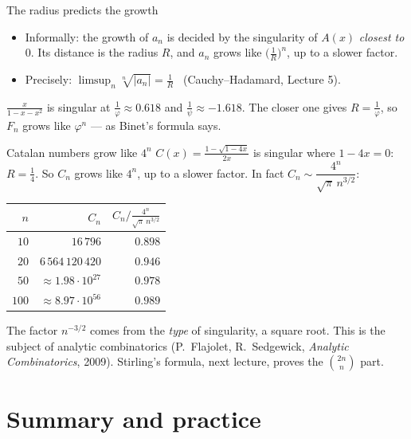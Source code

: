 \documentclass{wosm-slides}
\begin{document}
\begin{frame}{The radius predicts the growth}
  \begin{itemize}
    \item Informally: the growth of $a_n$ is decided by the singularity of $A(x)$ \emph{closest
      to $0$}. Its distance is the radius $R$, and $a_n$ grows like $\bigl(\frac1R\bigr)^n$,
      up to a slower factor.
    \item Precisely: $\limsup_n \sqrt[n]{|a_n|} = \frac1R$ \ (Cauchy--Hadamard, Lecture 5).
  \end{itemize}
  \pause
  \begin{example}[Fibonacci]
    $\frac{x}{1 - x - x^2}$ is singular at $\frac1\varphi \approx 0.618$ and
    $\frac1\psi \approx -1.618$. The closer one gives $R = \frac1\varphi$, so $F_n$ grows like
    $\varphi^n$ --- as Binet's formula says.
  \end{example}
\end{frame}

\begin{frame}{Catalan numbers grow like $4^n$}
  $C(x) = \frac{1 - \sqrt{1 - 4x}}{2x}$ is singular where $1 - 4x = 0$: \ $R = \frac14$.
  So $C_n$ grows like $4^n$, up to a slower factor. In fact
  $C_n \sim \dfrac{4^n}{\sqrt\pi\, n^{3/2}}$:
  \begin{center}
  \small
  \begin{tabular}{rrr}
    \toprule
    $n$ & $C_n$ & $C_n \big/ \frac{4^n}{\sqrt\pi\, n^{3/2}}$ \\
    \midrule
    $10$  & $16\,796$             & $0.898$ \\
    $20$  & $6\,564\,120\,420$    & $0.946$ \\
    $50$  & $\approx 1.98 \cdot 10^{27}$ & $0.978$ \\
    $100$ & $\approx 8.97 \cdot 10^{56}$ & $0.989$ \\
    \bottomrule
  \end{tabular}
  \end{center}
  {\small The factor $n^{-3/2}$ comes from the \emph{type} of singularity, a square root.
  This is the subject of analytic combinatorics (P.~Flajolet, R.~Sedgewick,
  \emph{Analytic Combinatorics}, 2009). Stirling's formula, next lecture, proves the
  $\binom{2n}{n}$ part.\par}
\end{frame}

\section{Summary and practice}
\end{document}
